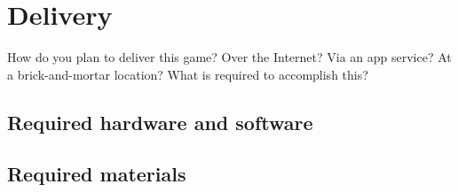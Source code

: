 \section{Delivery} %
How do you plan to deliver this game? Over the Internet? Via an app service? At a brick-and-mortar location? What is required to accomplish this?
\subsection{Required hardware and software} %

\subsection{Required materials} %
